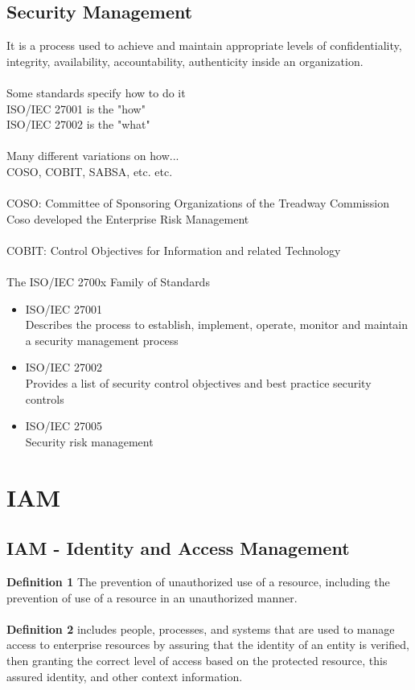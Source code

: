 \documentclass[10pt,a4paper]{book}
\begin{document}
\section{Security Management}
It is a process used to achieve and maintain appropriate levels of confidentiality, integrity, availability, accountability, authenticity inside an organization.\\\\
Some standards specify how to do it \\
ISO/IEC 27001 is the "how" \\
ISO/IEC 27002 is the "what" \\\\
Many different variations on how... \\
COSO, COBIT, SABSA, etc. etc.\\\\
COSO: Committee of Sponsoring Organizations of the Treadway Commission\\
	Coso developed the Enterprise Risk Management\\\\
COBIT: Control Objectives for Information and related Technology\\\\
The ISO/IEC 2700x Family of Standards
\begin{itemize}

\item ISO/IEC 27001\\
Describes the process to establish, implement, operate, monitor and maintain a security management process
\item ISO/IEC 27002\\
Provides a list of security control objectives and best practice 
security controls
\item ISO/IEC 27005 \\
Security risk management
\end{itemize}

\chapter{IAM}
\section{IAM - Identity and Access Management}
\textbf{Definition 1} The prevention of unauthorized use of a resource, including the prevention of use of a resource in an unauthorized manner.\\\\
\textbf{Definition 2} includes people, processes, and systems that are used to manage access to enterprise resources by assuring that the identity of an entity is verified, then granting the correct level of access based on the protected resource, this assured identity, and other context information.\\\\
\end{document}
